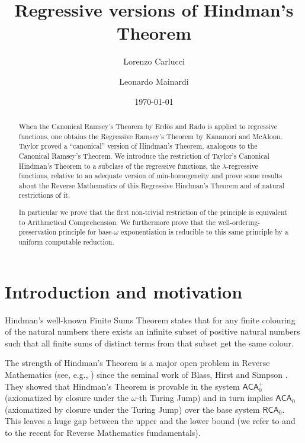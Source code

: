 \documentclass[a4paper,11pt]{article}
\title{Regressive versions of Hindman's Theorem}
\author[1]{Lorenzo Carlucci}
\author[2]{Leonardo Mainardi}
\affil[1]{Sapienza University of Rome, Department of Mathematics}
\affil[2]{Sapienza University of Rome, Department of Computer Science}
\affil[1]{lorenzo.carlucci@uniroma1.it}
\affil[2]{leonardo.mainardi@uniroma1.it}
\date{\today{}}
\newcommand\RCA{\mathsf{RCA}}
\newcommand\ACA{\mathsf{ACA}}
\begin{document}


\maketitle


\begin{abstract}

When the Canonical Ramsey's Theorem by Erd\H{o}s and Rado
is applied to regressive functions, one obtains the Regressive Ramsey's Theorem by Kanamori and McAloon.
Taylor proved a ``canonical'' version of Hindman's Theorem, analogous to the Canonical Ramsey's Theorem. 
We introduce the restriction of Taylor's Canonical Hindman's Theorem 
to a subclass of the regressive functions, the $\lambda$-regressive functions, relative to an adequate 
version of min-homogeneity and prove some results about the Reverse Mathematics of this Regressive
Hindman's Theorem and of natural restrictions of it.

In particular we prove that the first non-trivial restriction of the principle is equivalent to Arithmetical 
Comprehension. We furthermore prove that the well-ordering-preservation principle for base-$\omega$ exponentiation is reducible to this same principle by a uniform computable reduction.
\end{abstract}










\section{Introduction and motivation}

Hindman's well-known Finite Sums Theorem \cite{Hin:74} states that for any finite colouring of 
the natural numbers there exists an infinite
subset of positive natural numbers such that all finite sums of distinct terms from that subset get the same
colour. 

The strength of Hindman's Theorem is a major open problem in Reverse Mathematics 
(see, e.g., \cite{Mon:11:open}) since the seminal work of Blass, Hirst and Simpson \cite{Bla-Hir-Sim:87}. They 
showed that Hindman's Theorem is provable in the system $\ACA_0^+$ (axiomatized by closure under the $\omega$-th Turing Jump) and in turn implies $\ACA_0$ (axiomatized by closure under the Turing Jump) over the base system $\RCA_0$. This leaves a huge gap between the upper and the lower bound (we refer to \cite{Sim:SOSOA, Hir:STT:14} and to the recent \cite{Dza-Mum:22} for Reverse Mathematics fundamentals).
\end{document}
